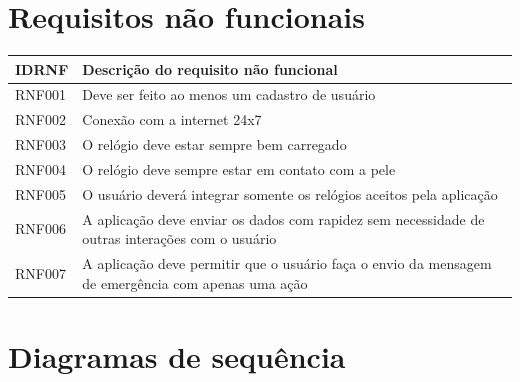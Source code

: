 \documentclass[
	12pt,				%
	openright,			%
	twoside,			%
	a4paper,			%
	english,			%
	french,				%
	spanish,			%
	brazil				%
]{abntex2}
\begin{document}
\chapter{Requisitos não funcionais}
\begin{center}
\begin{tabular}{ |p{7cm}|p{7cm}| }
 \hline
 \textbf{IDRNF} & \textbf{Descrição do requisito não funcional} \\ [0.5ex]
 \hline
 RNF001 & Deve ser feito ao menos um cadastro de usuário \\
 \hline
 RNF002 & Conexão com a internet 24x7 \\
 \hline
 RNF003 & O relógio deve estar sempre bem carregado \\
 \hline
 RNF004 & O relógio deve sempre estar em contato com a pele \\
 \hline
 RNF005 & O usuário deverá integrar somente os relógios aceitos pela aplicação \\
 \hline
 RNF006 & A aplicação deve enviar os dados com rapidez sem necessidade de outras interações
  com o usuário \\
  \hline
 RNF007 & A aplicação deve permitir que o usuário faça o envio da mensagem de emergência com apenas uma ação \\
 \hline
\end{tabular}
\end{center}

\chapter{Diagramas de sequência}
%
\end{document}
